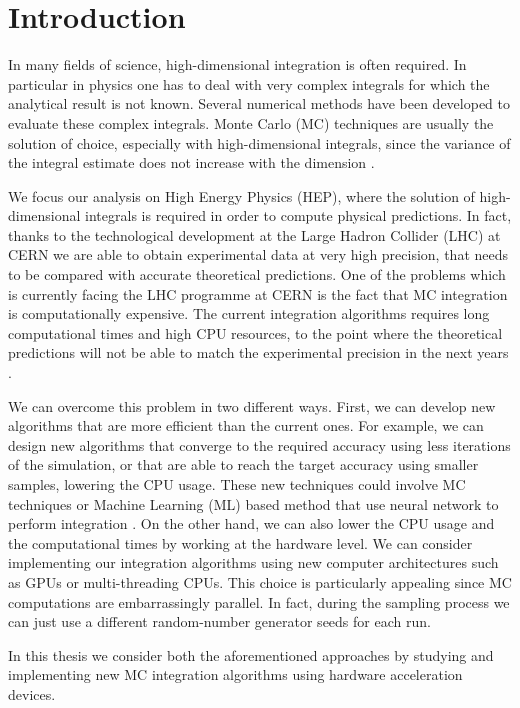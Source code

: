 \documentclass[../main/main.tex]{subfiles}
\begin{document}
\chapter*{Introduction}

In many fields of science, high-dimensional integration is often required. In particular in physics one has to deal with very complex integrals for which the analytical result is not known. Several numerical methods have been developed to evaluate these complex integrals. Monte Carlo (MC) techniques are usually the solution of choice, especially with high-dimensional integrals, since the variance of the integral estimate does not increase with the dimension \cite{Press:1992zz}.

We focus our analysis on High Energy Physics (HEP), where the solution of high-dimensional integrals is required in order to compute physical predictions. In fact, thanks to the technological development at the Large Hadron Collider (LHC) at CERN we are able to obtain experimental data at very high precision, that needs to be compared with accurate theoretical predictions.
One of the problems which is currently facing the LHC programme at CERN \cite{Dainese:2703572} is the fact that MC integration is computationally expensive. The current integration algorithms requires long computational times  and high CPU resources, to the point where the theoretical predictions will not be able to match the experimental precision in the next years \cite{Buckley:2019wov, Apollinari:2017cqg, Abada:2019zxq}.

We can overcome this problem in two different ways. First, we can develop new algorithms that are more efficient than the current ones. For example, we can design new algorithms that converge to the required accuracy using less iterations of the simulation, or that are able to reach the target accuracy using smaller samples, lowering the CPU usage. These new techniques could involve MC techniques or Machine Learning (ML) based method that use neural network to perform integration \cite{Bendavid:2017zhk}.
On the other hand, we can also lower the CPU usage and the computational times  by working at the hardware level.
We can consider implementing our integration algorithms using new computer architectures such as GPUs or multi-threading CPUs. This choice is particularly appealing since MC computations are embarrassingly parallel. In fact, during the sampling process we can just use a different random-number generator seeds for each run.

In this thesis we consider both the aforementioned approaches by studying and implementing new MC integration algorithms using hardware acceleration devices.
\end{document}
